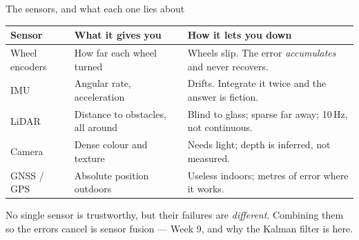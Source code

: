 \documentclass[aspectratio=169]{beamer}
\begin{document}
\begin{frame}{The sensors, and what each one lies about}
  \small
  \begin{center}
  \begin{tabular}{@{}p{2.2cm}p{3.7cm}p{5.2cm}@{}}
    \toprule
    \textbf{Sensor} & \textbf{What it gives you} & \textbf{How it lets you down} \\
    \midrule
    Wheel encoders & How far each wheel turned & Wheels slip. The error \emph{accumulates} and never recovers. \\[0.3em]
    IMU & Angular rate, acceleration & Drifts. Integrate it twice and the answer is fiction. \\[0.3em]
    LiDAR & Distance to obstacles, all around & Blind to glass; sparse far away; 10\,Hz, not continuous. \\[0.3em]
    Camera & Dense colour and texture & Needs light; depth is inferred, not measured. \\[0.3em]
    GNSS / GPS & Absolute position outdoors & Useless indoors; metres of error where it works. \\
    \bottomrule
  \end{tabular}
  \end{center}

  \begin{underhood}
    \footnotesize
    No single sensor is trustworthy, but their failures are \emph{different}. Combining them
    so the errors cancel is sensor fusion --- Week 9, and why the Kalman filter is here.
  \end{underhood}
\end{frame}
\end{document}
